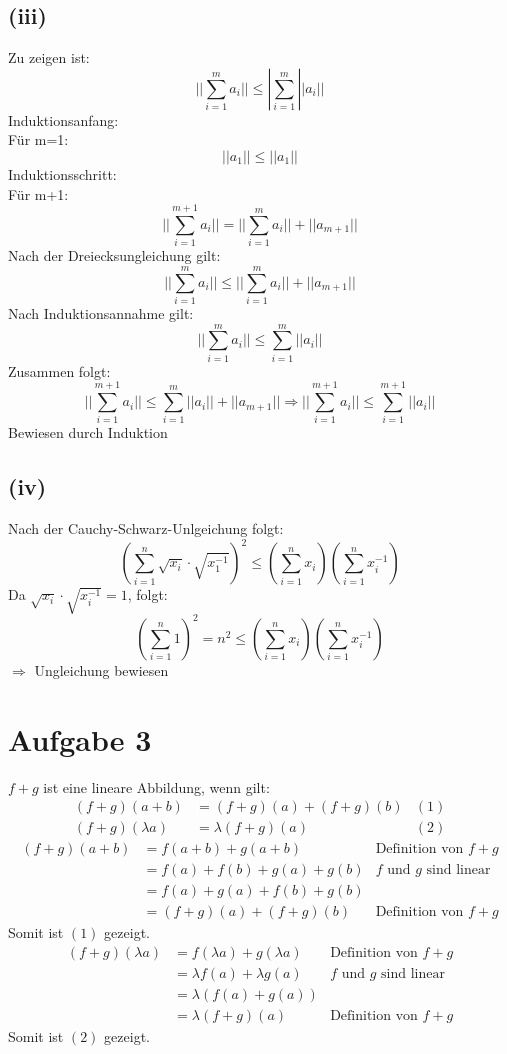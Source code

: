 \documentclass{article}
\begin{document}
\subsection{(iii)}
Zu zeigen ist:
\[||\sum_{i=1}^{m}a_i|| \leq|\sum_{i=1}^{m}||a_i||\]
Induktionsanfang: \\
Für m=1:  \[||a_1||\leq ||a_1||\]
Induktionsschritt: \\
Für m+1: 
\[ ||\sum_{i=1}^{m+1}a_i|| = ||\sum_{i=1}^m a_i|| + ||a_{m+1}|| \]
Nach der Dreiecksungleichung gilt:
\[||\sum_{i=1}^ma_i|| \leq ||\sum_{i=1}^ma_i||+||a_{m+1}||\]
Nach Induktionsannahme gilt:
\[||\sum_{i=1}^ma_i|| \leq \sum_{i=1}^m||a_i||\]
Zusammen folgt:
\[||\sum_{i=1}^{m+1}a_i|| \leq \sum_{i=1}^m||a_i|| + ||a_{m+1}|| \Longrightarrow ||\sum_{i=1}^{m+1}a_i|| \leq \sum_{i=1}^{m+1}||a_i|| \]
Bewiesen durch Induktion



\subsection{(iv)}
Nach der Cauchy-Schwarz-Unlgeichung folgt: 
\[(\sum_{i=1}^n{\sqrt{x_i}\cdot \sqrt{x_1^{-1}}})^2 \leq (\sum_{i=1}^{n}x_i) (\sum_{i=1}^{n}x_i^{-1})\]
Da $\sqrt{x_i} \cdot \sqrt{x_i^{-1}} = 1 $, folgt:
\[(\sum_{i=1}^n 1)^2 =n^2 \leq (\sum_{i=1}^n x_i)(\sum_{i=1}^n x_i^{-1})\]
$\Longrightarrow$ Ungleichung bewiesen

\section{Aufgabe 3}
$f+g$ ist eine lineare Abbildung, wenn gilt:
\begin{align*}
    (f+g)(a+b) &= (f+g)(a)+(f+g)(b) & (1) \\
    (f+g)(\lambda a) &= \lambda(f+g)(a) & (2)
\end{align*}
\newline
\begin{align*}
    (f+g)(a+b) &= f(a+b)+g(a+b) &\text{Definition von $f+g$}\\
    &= f(a)+f(b) + g(a)+g(b) &\text{$f$ und $g$ sind linear}\\
    &= f(a)+g(a) + f(b) + g(b) \\
    &= (f+g)(a) + (f+g)(b) &\text{Definition von $f+g$}
\end{align*}
Somit ist $(1)$ gezeigt. \\
\newline
\begin{align*}
    (f+g)(\lambda a) &= f(\lambda a) + g(\lambda a) &\text{Definition von $f+g$} \\
    &= \lambda f(a) + \lambda g(a) & \text{$f$ und $g$ sind linear} \\
    &= \lambda(f(a)+g(a)) \\
    &= \lambda(f+g)(a) & \text{Definition von $f+g$}
\end{align*}
Somit ist $(2)$ gezeigt. \\
\end{document}
